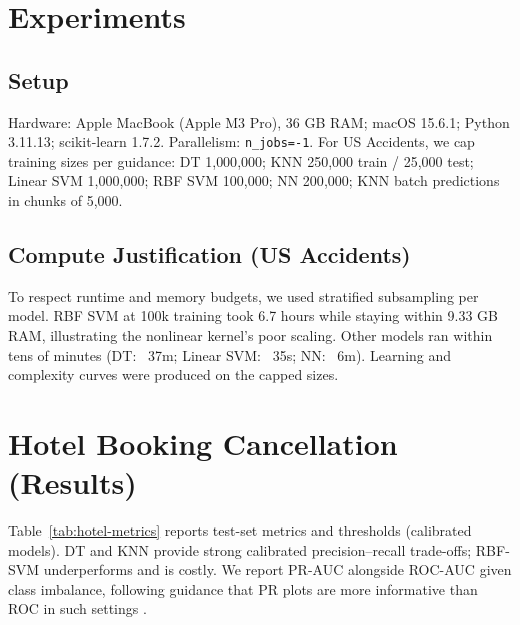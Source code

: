 \documentclass[conference]{IEEEtran}
\newcommand{\datasetA}{Hotel Booking Cancellation}
\newcommand{\datasetB}{US Accidents}
\begin{document}
\section{Experiments}
\subsection{Setup}
Hardware: Apple MacBook (Apple M3 Pro), 36 GB RAM; macOS 15.6.1; Python 3.11.13; scikit-learn 1.7.2. Parallelism: \texttt{n\_jobs=-1}. For \datasetB{}, we cap training sizes per guidance: DT 1{,}000{,}000; KNN 250{,}000 train / 25{,}000 test; Linear SVM 1{,}000{,}000; RBF SVM 100{,}000; NN 200{,}000; KNN batch predictions in chunks of 5{,}000.

\subsection{Compute Justification (\datasetB)}
To respect runtime and memory budgets, we used stratified subsampling per model. RBF SVM at 100k training took 6.7 hours while staying within 9.33 GB RAM, illustrating the nonlinear kernel's poor scaling. Other models ran within tens of minutes (DT: ~37m; Linear SVM: ~35s; NN: ~6m). Learning and complexity curves were produced on the capped sizes.

\section{\datasetA{} (Results)}
Table~\ref{tab:hotel-metrics} reports test-set metrics and thresholds (calibrated models). DT and KNN provide strong calibrated precision–recall trade-offs; RBF-SVM underperforms and is costly. We report PR-AUC alongside ROC-AUC given class imbalance, following guidance that PR plots are more informative than ROC in such settings \cite{Saito2015PRvsROC}.

\begin{table}[htbp]
\caption{Test-set metrics on \datasetA{} (calibrated; thresholds chosen to maximize validation F1).}
\begin{center}
\label{tab:hotel-metrics}
\end{center}
\end{table}
\end{document}
